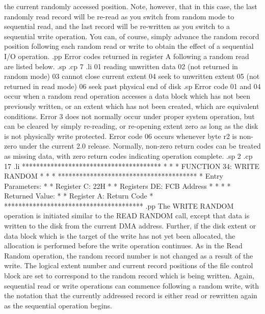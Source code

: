the current randomly accessed position.  Note, however,
that in this case, the last randomly read record will
be re-read as you switch from random mode to sequential
read, and the last record will be re-written as you
switch to a sequential write operation.
You can, of course, simply advance the random
record position following each random read or write to obtain
the effect of a sequential I/O operation.
.pp
Error codes returned in register A following a random
read are listed below.
.sp
.cp 7
.li
                01  reading unwritten data
                02  (not returned in random mode)
                03  cannot close current extent
                04  seek to unwritten extent
                05  (not returned in read mode)
                06  seek past physical end of disk
.sp
Error code 01 and 04 occur when a random read operation
accesses a data block which has not been previously
written, or an extent which has not been created, which
are equivalent conditions.  Error 3 does not normally
occur under proper system operation, but can be cleared
by simply re-reading, or re-opening extent zero
as long as the disk is not physically write protected.
Error code 06 occurs whenever byte r2 is non-zero under
the current 2.0 release.
Normally, non-zero return codes can be treated as missing
data, with zero return codes indicating operation complete.
.sp 2
.cp 17
.li
***************************************
*                                     *
*  FUNCTION 34: WRITE RANDOM          *
*                                     *
***************************************
*  Entry Parameters:                  *
*      Register   C:  22H             *
*      Registers DE:  FCB Address     *
*                                     *
*  Returned   Value:                  *
*      Register   A:  Return Code     *
***************************************
.pp
The WRITE RANDOM operation is initiated similar
to the READ RANDOM call, except that data is written to
the disk from the current DMA address.  Further, if the
disk extent or data block which is the target of the
write has not yet been allocated, the allocation is performed
before the write operation continues.  As in the Read
Random operation, the random record number is not changed
as a result of the write.  The logical extent number
and current record positions of the file control block
are set to correspond to the random record which is
being written.
Again, sequential read or write operations can commence
following a random write, with the notation that the
currently addressed record is either read or rewritten
again as the sequential operation begins.
